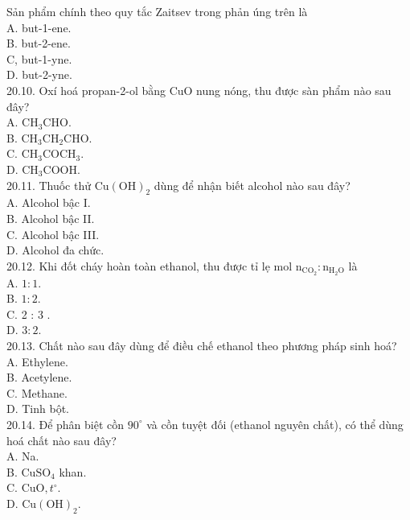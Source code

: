 \documentclass[10pt]{article}
\begin{document}
Sản phẩm chính theo quy tắc Zaitsev trong phản úng trên là\\
A. but-1-ene.\\
B. but-2-ene.\\
C, but-1-yne.\\
D. but-2-yne.\\
20.10. Oxí hoá propan-2-ol bằng CuO nung nóng, thu được sàn phẩm nào sau đây?\\
A. $\mathrm{CH}_{3} \mathrm{CHO}$.\\
B. $\mathrm{CH}_{3} \mathrm{CH}_{2} \mathrm{CHO}$.\\
C. $\mathrm{CH}_{3} \mathrm{COCH}_{3}$.\\
D. $\mathrm{CH}_{3} \mathrm{COOH}$.\\
20.11. Thuốc thử $\mathrm{Cu}(\mathrm{OH})_{2}$ dùng để nhận biết alcohol nào sau đây?\\
A. Alcohol bậc I.\\
B. Alcohol bậc II.\\
C. Alcohol bậc III.\\
D. Alcohol đa chức.\\
20.12. Khi đốt cháy hoàn toàn ethanol, thu được tỉ lẹ mol $\mathrm{n}_{\mathrm{CO}_{2}}: \mathrm{n}_{\mathrm{H}_{2} \mathrm{O}}$ là\\
A. $1: 1$.\\
B. $1: 2$.\\
C. 2 : 3 .\\
D. $3: 2$.\\
20.13. Chất nào sau đây dùng để điều chế ethanol theo phương pháp sinh hoá?\\
A. Ethylene.\\
B. Acetylene.\\
C. Methane.\\
D. Tinh bột.\\
20.14. Để phân biệt cồn $90^{\circ}$ và cồn tuyệt đối (ethanol nguyên chất), có thể dùng hoá chất nào sau đây?\\
A. Na.\\
B. $\mathrm{CuSO}_{4}$ khan.\\
C. $\mathrm{CuO}, t^{\circ}$.\\
D. $\mathrm{Cu}(\mathrm{OH})_{2}$.
\end{document}
